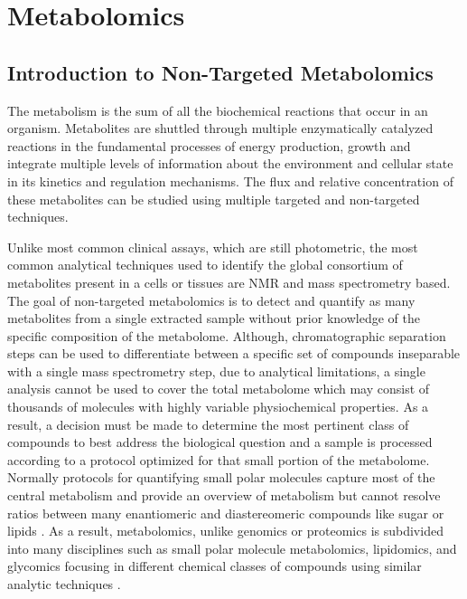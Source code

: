 \documentclass[a4paper,11pt,twoside]{book}
\begin{document}
	\chapter{Metabolomics}
	
	\section{Introduction to Non-Targeted Metabolomics}
	
	The metabolism is the sum of all the biochemical reactions that occur in an organism. Metabolites are shuttled through multiple enzymatically catalyzed reactions in the fundamental processes of energy production, growth and integrate multiple levels of information about the environment and cellular state in its kinetics and regulation mechanisms. The flux and relative concentration of these metabolites can be studied using multiple targeted and non-targeted techniques\citep{Aksenov2017GlobalSpectrometry}. 
	
    Unlike most common clinical assays, which are still photometric, the most common analytical techniques used to identify the global consortium of metabolites present in a cells or tissues are NMR and mass spectrometry based\citep{StanfordBloodTests}. The goal of non-targeted metabolomics is to detect and quantify as many metabolites from a single extracted sample without prior knowledge of the specific composition of the metabolome. Although, chromatographic separation steps can be used to differentiate between a specific set of compounds inseparable with a single mass spectrometry step, due to analytical limitations, a single analysis cannot be used to cover the total metabolome which may consist of thousands of molecules with highly variable physiochemical properties. As a result, a decision must be made to determine the most pertinent class of compounds to best address the biological question and a sample is processed according to a protocol optimized for that small portion of the metabolome. Normally protocols for quantifying small polar molecules capture most of the central metabolism and provide an overview of metabolism but cannot resolve ratios between many enantiomeric and diastereomeric compounds like sugar or lipids \citep{FGCZ2017MetabolomicsZurich}. As a result, metabolomics, unlike genomics or proteomics is subdivided into many disciplines such as small polar molecule metabolomics, lipidomics, and glycomics focusing in different chemical classes of compounds using similar analytic techniques \citep{FGCZ2017MetabolomicsZurich}.
	
\end{document}

